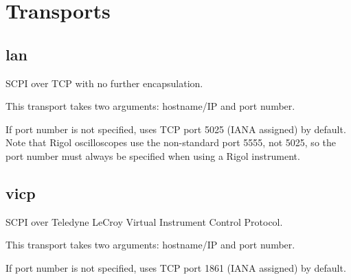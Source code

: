 \section{Transports}
\label{sec:transports}

\subsection{lan}

SCPI over TCP with no further encapsulation.

This transport takes two arguments: hostname/IP and port number.

If port number is not specified, uses TCP port 5025 (IANA assigned) by default. Note that Rigol oscilloscopes use the
non-standard port 5555, not 5025, so the port number must always be specified when using a Rigol instrument.

\subsection{vicp}

SCPI over Teledyne LeCroy Virtual Instrument Control Protocol.

This transport takes two arguments: hostname/IP and port number.

If port number is not specified, uses TCP port 1861 (IANA assigned) by default.
